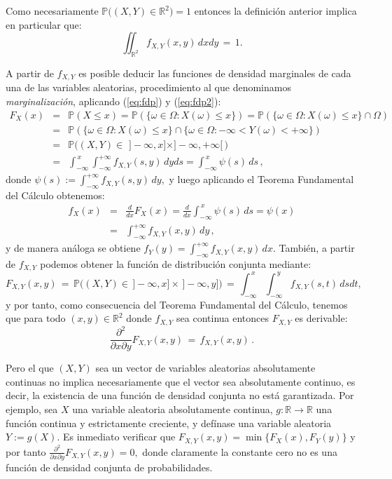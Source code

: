 \documentclass[spanish,10pt,letterpaper]{article}
\newcommand{\prob}{\mathbb{P}}
\newcommand{\Runo}{\mathbb{R}}
\begin{document}
Como necesariamente $\prob\big((X,Y)\in\Runo^2\big)=1$ entonces la definición anterior implica en particular que:
$$\iint_{\Runo^2}f_{X,Y}(x,y)\,dxdy \,=\, 1.$$

A partir de $f_{X,Y}$ es posible deducir las funciones de densidad marginales de cada una de las variables aleatorias, procedimiento al que denominamos \textit{marginalización}, aplicando (\ref{eq:fdp}) y (\ref{eq:fdp2}):
\begin{eqnarray*}
    F_{X}(x) &=& \prob(X\leq x) = \prob(\{\omega\in\Omega:X(\omega)\leq x\}) = \prob(\{\omega\in\Omega:X(\omega)\leq x\} \cap \Omega)\\ 
             &=& \prob(\{\omega\in\Omega:X(\omega)\leq x\} \cap \{\omega\in\Omega:-\infty < Y(\omega) < +\infty\}) \\
             &=& \prob\big((X,Y)\in\,\,]-\infty,x]\times]-\infty,+\infty[\,\big) \\ 
             &=& \int_{-\infty}^{\,x}\int_{-\infty}^{+\infty}f_{X,Y}(s,y)\,dyds = \int_{-\infty}^{\,x}\psi(s)\,ds\,,
\end{eqnarray*}
donde $\psi(s):=\int_{-\infty}^{+\infty}f_{X,Y}(s,y)\,dy,$ y luego aplicando el Teorema Fundamental del Cálculo obtenemos:
\begin{eqnarray}\label{eq:marginalizafdpconjunta}
    f_{X}(x) &=& \frac{d}{dx}F_{X}(x) = \frac{d}{dx}\int_{-\infty}^{\,x}\psi(s)\,ds = \psi(x) \nonumber\\
             &=& \int_{-\infty}^{+\infty}f_{X,Y}(x,y)\,dy\,,
\end{eqnarray}
y de manera análoga se obtiene $f_{Y}(y)=\int_{-\infty}^{+\infty}f_{X,Y}(x,y)\,dx.$ También, a partir de $f_{X,Y}$ podemos obtener la función de distribución conjunta mediante:
\begin{equation}\label{eq:teorfundcalcbiv1}
    F_{X,Y}(x,y) \,=\, \prob\big((X,Y)\in\,]-\infty,x]\times\,]-\infty,y]\big) \,=\, \int_{-\infty}^{\,x}\int_{-\infty}^{\,y}f_{X,Y}(s,t)\,dsdt,
\end{equation}
y por tanto, como consecuencia del Teorema Fundamental del Cálculo, tenemos que para todo $(x,y)\in\Runo^2$ donde $f_{X,Y}$ sea continua entonces $F_{X,Y}$ es derivable:
\begin{equation}\label{eq:teorfundcalcbiv2}
    \frac{\partial^2}{\partial x\partial y}F_{X,Y}(x,y) \,=\, f_{X,Y}(x,y)\,.
\end{equation}

Pero el que $(X,Y)$ sea un vector de variables aleatorias absolutamente continuas no implica necesariamente que el vector sea absolutamente continuo, es decir, la existencia de una función de densidad conjunta no está garantizada. Por ejemplo, sea $X$ una variable aleatoria absolutamente continua, $g:\Runo\rightarrow\Runo$ una función continua y estrictamente creciente, y defínase una variable aleatoria $Y:=g(X).$ Es inmediato verificar que $F_{X,Y}(x,y)=\min\{F_X(x),F_Y(y)\}$ y por tanto $\displaystyle{\frac{\partial^2}{\partial x\partial y}}F_{X,Y}(x,y)=0,$ donde claramente la constante cero no es una función de densidad conjunta de probabilidades.
\end{document}
